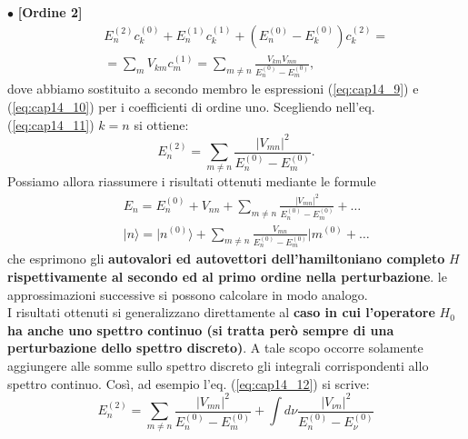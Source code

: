 \documentclass[a4paper,12pt,oneside]{book}
\begin{document}
$\bullet$ \textbf{[Ordine 2]}\\
\begin{eqnarray}
& & E_n^{(2)}c_k^{(0)}+E_n^{(1)}c_k^{(1)}+ \left( E_n^{(0)}-E_k ^{(0)}\right) c_k^{(2)} = \nonumber \\
& & = \sum _m V_{km} c_m ^{(1)} = \sum _{m\neq n} \frac{V_{km} V_{mn}}{E_n^{(0)}-E_m ^{(0)}},
\label{eq:cap14_11}
\end{eqnarray}
dove abbiamo sostituito a secondo membro le espressioni (\ref{eq:cap14_9}) e (\ref{eq:cap14_10}) per i coefficienti di ordine uno. Scegliendo nell'eq. (\ref{eq:cap14_11}) $k=n$ si ottiene:
\begin{equation}
E_n ^{(2)} = \sum _{m \neq n } \frac{\vert V_{mn} \vert ^2}{E_n ^{(0)}-E_m ^{(0)}}.
\label{eq:cap14_12}
\end{equation}
Possiamo allora riassumere i risultati ottenuti mediante le formule
\begin{eqnarray}
& & E_n = E_n ^{(0)}+ V_{nn} +\sum _{m \neq n } \frac{\vert V_{mn} \vert ^2}{E_n ^{(0)}-E_m ^{(0)}}+ \dots \\
& & \vert n \rangle = \vert n^{(0)} \rangle +\sum _{m \neq n } \frac{V_{mn} }{E_n ^{(0)}-E_m ^{(0)}} \vert m^{(0)}+ \dots 
\end{eqnarray}
che esprimono gli \textbf{autovalori ed autovettori dell'hamiltoniano completo} $H$ \textbf{rispettivamente al secondo ed al primo ordine nella perturbazione}. le approssimazioni successive si possono calcolare in modo analogo.\\
I risultati ottenuti si generalizzano direttamente al \textbf{caso in cui l'operatore} $H_0$ \textbf{ha anche uno spettro continuo (si tratta però sempre di una perturbazione dello spettro discreto)}. A tale scopo occorre solamente aggiungere alle somme sullo spettro discreto gli integrali corrispondenti allo spettro continuo. Così, ad esempio l'eq. (\ref{eq:cap14_12}) si scrive:
\begin{equation}
E_n ^{(2)} = \sum _{m \neq n} \frac{\vert V_{mn} \vert ^2}{E_n ^{(0)}-E_m ^{(0)}}+ \int d\nu \frac{\vert V_{\nu n} \vert ^2}{E_n ^{(0)}-E_{\nu} ^{(0)}} 
\end{equation}
\end{document}
